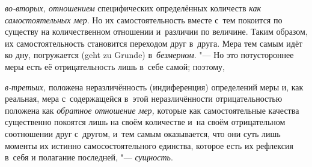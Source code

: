 {\em во-вторых, отношением} специфических определённых количеств
{\em как самостоятельных мер}. Но их самостоятельность вместе с~тем покоится по
существу на количественном отношении и~различии по величине. Таким образом, их
самостоятельность становится переходом друг в~друга. Мера тем самым идёт ко
дну, погружается (geht zu Grunde) в~{\em безмерном}. "--- Но это потустороннее
меры есть её отрицательность лишь в~себе самой; поэтому,

{\em в-третьих,} положена неразличённость (индиференция) определений меры и,
как реальная, мера с~содержащейся в~этой неразличённости отрицательностью
положена как {\em обратное отношение мер,} которые как самостоятельные качества
существенно покоятся лишь на своём количестве и~на своём отрицательном
соотношении друг с~другом, и~тем самым оказывается, что они суть лишь моменты
их истинно самосостоятельного единства, которое есть их рефлексия в~себя и
полагание последней, "--- {\em сущность}.

